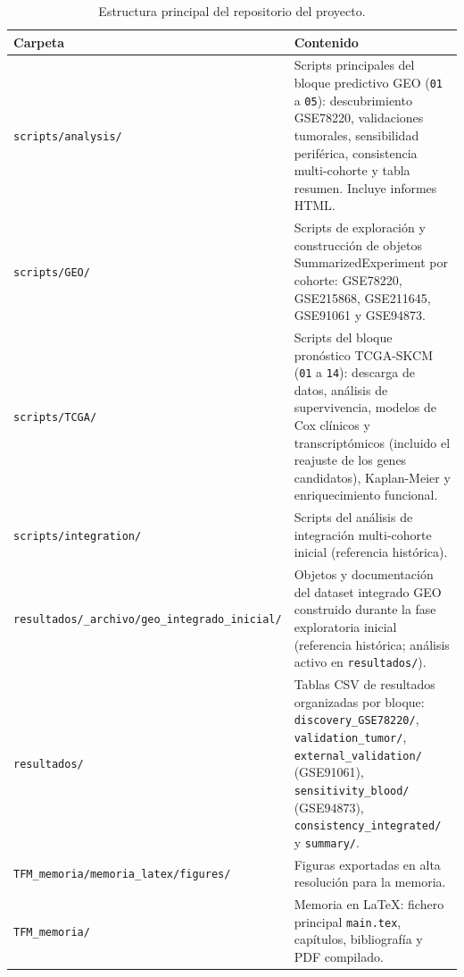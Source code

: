 \begin{table}[H]
\centering
\caption{Estructura principal del repositorio del proyecto.}
\label{tab:repo}
\begin{tabularx}{\textwidth}{l X}
\toprule
\textbf{Carpeta} & \textbf{Contenido} \\
\midrule
\texttt{scripts/analysis/} & Scripts principales del bloque predictivo GEO (\texttt{01} a \texttt{05}): descubrimiento GSE78220, validaciones tumorales, sensibilidad periférica, consistencia multi-cohorte y tabla resumen. Incluye informes HTML. \\
\addlinespace
\texttt{scripts/GEO/} & Scripts de exploración y construcción de objetos SummarizedExperiment por cohorte: GSE78220, GSE215868, GSE211645, GSE91061 y GSE94873. \\
\addlinespace
\texttt{scripts/TCGA/} & Scripts del bloque pronóstico TCGA-SKCM (\texttt{01} a \texttt{14}): descarga de datos, análisis de supervivencia, modelos de Cox clínicos y transcriptómicos (incluido el reajuste de los genes candidatos), Kaplan-Meier y enriquecimiento funcional. \\
\addlinespace
\texttt{scripts/integration/} & Scripts del análisis de integración multi-cohorte inicial (referencia histórica). \\
\addlinespace
\texttt{resultados/\_archivo/geo\_integrado\_inicial/} & Objetos y documentación del dataset integrado GEO construido durante la fase exploratoria inicial (referencia histórica; análisis activo en \texttt{resultados/}). \\
\addlinespace
\texttt{resultados/} & Tablas CSV de resultados organizadas por bloque: \texttt{discovery\_GSE78220/}, \texttt{validation\_tumor/}, \texttt{external\_validation/} (GSE91061), \texttt{sensitivity\_blood/} (GSE94873), \texttt{consistency\_integrated/} y \texttt{summary/}. \\
\addlinespace
\texttt{TFM\_memoria/memoria\_latex/figures/} & Figuras exportadas en alta resolución para la memoria. \\
\addlinespace
\texttt{TFM\_memoria/} & Memoria en \LaTeX{}: fichero principal \texttt{main.tex}, capítulos, bibliografía y PDF compilado. \\
\bottomrule
\end{tabularx}
\end{table}
